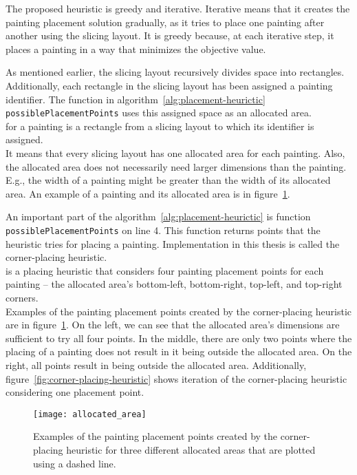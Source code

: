 The proposed heuristic is greedy and iterative.
Iterative means that it creates the painting placement solution gradually, as it
tries to place one painting after another using the slicing layout.
It is greedy because, at each iterative step, it places a painting in a way that minimizes the objective value.

As mentioned earlier, the slicing layout recursively divides space into rectangles.
Additionally, each rectangle in the slicing layout has been assigned a painting identifier.
The function in algorithm~\ref{alg:placement-heurictic} \verb|possiblePlacementPoints|
uses this assigned space as an allocated area.\\

 for a painting is a rectangle from a slicing layout to which its identifier is assigned.\\

It means that every slicing layout has one allocated area for each painting.
Also, the allocated area does not necessarily need larger dimensions than the painting.
E.g., the width of a painting might be greater than the width of its allocated area.
An example of a painting and its allocated area is in figure~\ref{fig:allocated-area}.

An important part of the algorithm~\ref{alg:placement-heurictic}
is function \verb|possiblePlacementPoints| on line 4.
This function returns points that the heuristic tries for placing a painting.
Implementation in this thesis is called the corner-placing heuristic.\\

 is a placing heuristic that considers four painting placement points for each painting
– the allocated area's bottom-left, bottom-right, top-left, and top-right corners.\\

Examples of the painting placement points created by the corner-placing heuristic are in figure~\ref{fig:allocated-area}.
On the left, we can see that the allocated area's dimensions are sufficient
to try all four points.
In the middle, there are only two points where the placing of a painting does not
result in it being outside the allocated area.
On the right, all points result in being outside the allocated area.
Additionally, figure~\ref {fig:corner-placing-heuristic} shows iteration of the corner-placing heuristic considering one placement point.

\begin{figure}[h!]
    \texttt{[image: allocated\_area]}
    \caption[Examples of the painting placement points created by the corner-placing heuristic]
    {Examples of the painting placement points created by the corner-placing heuristic
    for three different allocated areas that are plotted using a dashed line.}
    \label{fig:allocated-area}
\end{figure}

